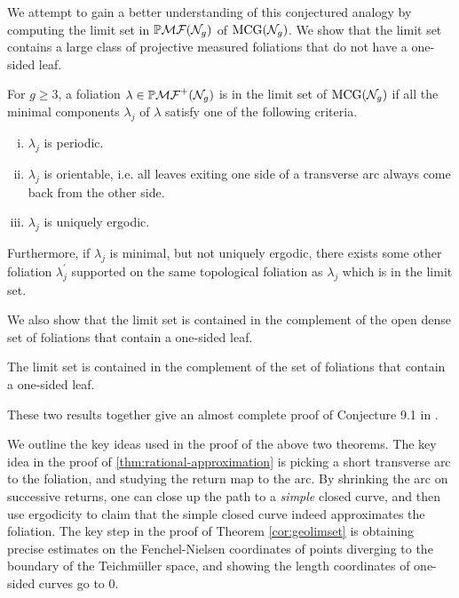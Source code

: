 \documentclass[12pt, reqno]{amsart}
\begin{document}
We attempt to gain a better understanding of this conjectured analogy by computing the limit set in $\mathbb{P}\mathcal{MF}(\mathcal{N}_g)$ of $\mathrm{MCG}(\mathcal{N}_g)$.
We show that the limit set contains a large class of projective measured foliations that do not have a one-sided leaf.

\begingroup
\def\thetheorem{\ref{thm:rational-approximation}}
\begin{theorem}
  For $g \geq 3$, a foliation $\lambda \in \mathbb{P}\mathcal{MF}^+(\mathcal{N}_g)$ is in the limit set of $\mathrm{MCG}(\mathcal{N}_g)$ if all the minimal components $\lambda_j$ of $\lambda$ satisfy one of the following criteria.
  \begin{enumerate}[(i)]
  \item $\lambda_j$ is periodic.
  \item $\lambda_j$ is orientable, i.e. all leaves exiting one side of a transverse arc always come back from the other side.
  \item $\lambda_j$ is uniquely ergodic.
  \end{enumerate}
  Furthermore, if $\lambda_j$ is minimal, but not uniquely ergodic, there exists some other foliation $\lambda_j^{\prime}$ supported on the same topological foliation as $\lambda_j$ which is in the limit set.
\end{theorem}
\addtocounter{theorem}{-1}
\endgroup

We also show that the limit set is contained in the complement of the open dense set of foliations that contain a one-sided leaf.
\begingroup
\def\thetheorem{\ref{cor:geolimset}}
\begin{theorem}
  The limit set is contained in the complement of the set of foliations that contain a one-sided leaf.
\end{theorem}
\addtocounter{theorem}{-1}
\endgroup
These two results together give an almost complete proof of Conjecture 9.1 in \cite{gendulphe_whats_2017}.

We outline the key ideas used in the proof of the above two theorems.
The key idea in the proof of \autoref{thm:rational-approximation} is picking a short transverse arc to the foliation, and studying the return map to the arc.
By shrinking the arc on successive returns, one can close up the path to a \emph{simple} closed curve, and then use ergodicity to claim that the simple closed curve indeed approximates the foliation.
The key step in the proof of Theorem \ref{cor:geolimset} is obtaining precise estimates on the Fenchel-Nielsen coordinates of points diverging to the boundary of the Teichm\"uller space, and showing the length coordinates of one-sided curves go to $0$.
\end{document}
